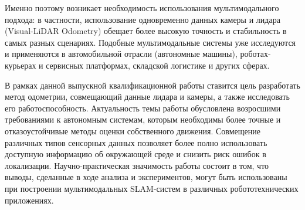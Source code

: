 Именно поэтому возникает необходимость использования мультимодального подхода: в частности, использование одновременно данных камеры и лидара (Visual-LiDAR Odometry) 
обещает более высокую точность и стабильность в самых разных сценариях. Подобные мультимодальные системы уже исследуются и применяются в автомобильной 
отрасли (автономные машины), роботах-курьерах и сервисных платформах, складской логистике и других сферах.

В рамках данной выпускной квалификационной работы ставится цель разработать метод одометрии, совмещающий данные лидара и камеры, а также исследовать его работоспособность. 
Актуальность темы работы обусловлена возросшими требованиями к автономным системам, которым необходимы более точные и 
отказоустойчивые методы оценки собственного движения. Совмещение различных типов сенсорных данных позволяет более полно использовать 
доступную информацию об окружающей среде и снизить риск ошибок в локализации. Научно-практическая значимость работы состоит в том, 
что выводы, сделанные в ходе анализа и экспериментов, могут быть использованы при построении мультимодальных SLAM-систем в различных 
робототехнических приложениях.
